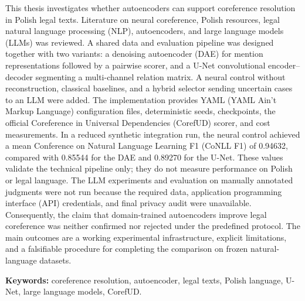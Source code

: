 This thesis investigates whether autoencoders can support coreference resolution in Polish legal texts. Literature on neural coreference, Polish resources, legal natural language processing (NLP), autoencoders, and large language models (LLMs) was reviewed. A shared data and evaluation pipeline was designed together with two variants: a denoising autoencoder (DAE) for mention representations followed by a pairwise scorer, and a U-Net convolutional encoder--decoder segmenting a multi-channel relation matrix. A neural control without reconstruction, classical baselines, and a hybrid selector sending uncertain cases to an LLM were added. The implementation provides YAML (YAML Ain't Markup Language) configuration files, deterministic seeds, checkpoints, the official Coreference in Universal Dependencies (CorefUD) scorer, and cost measurements. In a reduced synthetic integration run, the neural control achieved a mean Conference on Natural Language Learning F1 (CoNLL F1) of 0.94632, compared with 0.85544 for the DAE and 0.89270 for the U-Net. These values validate the technical pipeline only; they do not measure performance on Polish or legal language. The LLM experiments and evaluation on manually annotated judgments were not run because the required data, application programming interface (API) credentials, and final privacy audit were unavailable. Consequently, the claim that domain-trained autoencoders improve legal coreference was neither confirmed nor rejected under the predefined protocol. The main outcomes are a working experimental infrastructure, explicit limitations, and a falsifiable procedure for completing the comparison on frozen natural-language datasets.

\noindent\textbf{Keywords:} coreference resolution, autoencoder, legal texts, Polish language, U-Net, large language models, CorefUD.
